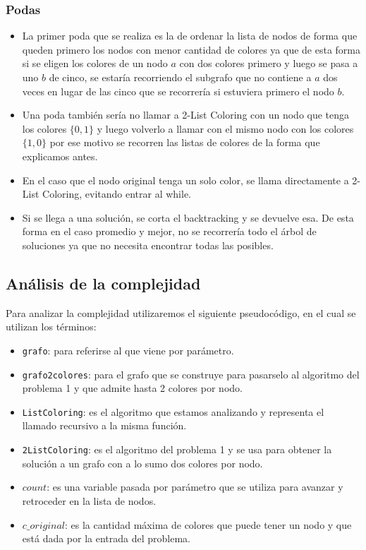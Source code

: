 \subsubsection{Podas}

\begin{itemize}
	\item La primer poda que se realiza es la de ordenar la lista de nodos de forma que queden primero los nodos con menor cantidad de colores ya que de esta forma si se eligen los colores de un nodo $a$ con dos colores primero y luego se pasa a uno $b$ de cinco, se estaría recorriendo el subgrafo que no contiene a $a$ dos veces en lugar de las cinco que se recorrería si estuviera primero el nodo $b$.
	\item Una poda también sería no llamar a 2-List Coloring con un nodo que tenga los colores $\{0, 1\}$ y luego volverlo a llamar con el mismo nodo con los colores $\{1, 0\}$ por ese motivo se recorren las listas de colores de la forma que explicamos antes.
	\item En el caso que el nodo original tenga un solo color, se llama directamente a 2-List Coloring, evitando entrar al while.
	\item Si se llega a una solución, se corta el backtracking y se devuelve esa. De esta forma en el caso promedio y mejor, no se recorrería todo el árbol de soluciones ya que no necesita encontrar todas las posibles.
\end{itemize}

\subsection{Análisis de la complejidad}

Para analizar la complejidad utilizaremos el siguiente pseudocódigo, en el cual se utilizan los términos:
\begin{itemize}
	\item \texttt{grafo}: para referirse al que viene por parámetro.
	\item \texttt{grafo2colores}: para el grafo que se construye para pasarselo al algoritmo del problema 1 y que admite hasta 2 colores por nodo.
	\item \texttt{ListColoring}: es el algoritmo que estamos analizando y representa el llamado recursivo a la misma función. 
	\item \texttt{2ListColoring}: es el algoritmo del problema 1 y se usa para obtener la solución a un grafo con a lo sumo dos colores por nodo.
	\item $count$: es una variable pasada por parámetro que se utiliza para avanzar y retroceder en la lista de nodos.
	\item $c\_original$: es la cantidad máxima de colores que puede tener un nodo y que está dada por la entrada del problema.
\end{itemize}

